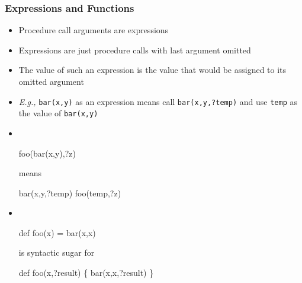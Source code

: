 \documentclass[12pt]{beamer}
\begin{document}
\begin{frame}[fragile]
\frametitle{Expressions and Functions}
\begin{itemize}
\item Procedure call arguments are expressions
\item Expressions are just procedure calls with last argument omitted
\item The value of such an expression is the value that would be assigned
  to its omitted argument
\item \emph{E.g.,} \alert{\texttt{bar(x,y)}} as an expression means call
  \alert{\texttt{bar(x,y,?temp)}} and use \alert{\texttt{temp}} as the value of
  \alert{\texttt{bar(x,y)}}
\item \\[-1ex]
  \begin{minipage}{0.35\linewidth}
    \begin{block}{}
\begin{semiverbatim}
foo(bar(x,y),?z)
\end{semiverbatim}
    \end{block}
  \end{minipage}
  \quad means \quad
  \begin{minipage}{0.3\linewidth}
    \begin{block}{}
\begin{semiverbatim}
bar(x,y,?temp)
foo(temp,?z)
\end{semiverbatim}
    \end{block}
  \end{minipage}
  \begin{minipage}[c]{0.4\linewidth}
  \end{minipage}
\item \\[-1ex]
  \begin{minipage}{0.45\linewidth}
    \begin{block}{}
\begin{semiverbatim}
def foo(x) = bar(x,x)
\end{semiverbatim}
    \end{block}
  \end{minipage}
\quad is syntactic sugar for \\[-.5ex]
  \begin{minipage}{0.95\linewidth}
    \begin{block}{}
\begin{semiverbatim}
def foo(x,?result) \{ bar(x,x,?result) \}

\end{semiverbatim}
\end{block}
\end{minipage}
\end{itemize}
\end{frame}
\end{document}
